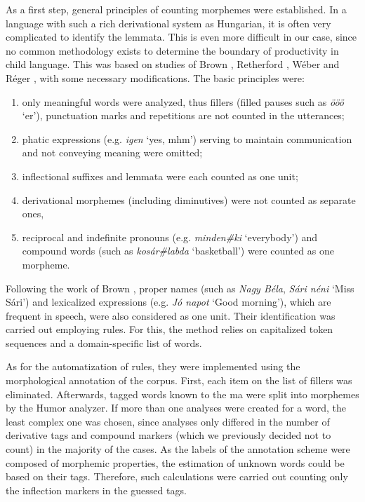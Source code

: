 As a first step, general principles of counting morphemes were established. 
In a language with such a rich derivational system as Hungarian, it is often very complicated to identify the lemmata. 
This is even more difficult in our case, since no common methodology exists to determine the boundary of productivity in child language. 
This was based on studies of Brown \cite{Brown1973}, Retherford \cite{retherford1993guide}, Wéber \cite{Weber2011} and Réger \cite{Reger1990}, with some necessary modifications. 
The basic principles were: 
\begin{enumerate}
 \item only meaningful words were analyzed, thus fillers (filled pauses such as \textit{ööö} `er’), punctuation marks and repetitions are not counted in the utterances;
 \item phatic expressions (e.g. \textit{igen} `yes, mhm’) serving to maintain communication and not conveying meaning were omitted;
 \item inflectional suffixes and lemmata were each counted as one unit; 
 \item derivational morphemes (including diminutives) were not counted as separate ones,
 \item reciprocal and indefinite pronouns (e.g. \textit{minden\#ki} `everybody’) and compound words (such as \textit{kosár\#labda} `basketball’) were counted as one morpheme.
 \end{enumerate}
 
Following the work of Brown \cite{Brown1973}, proper names (such as \textit{Nagy Béla}, \textit{Sári néni} `Miss Sári’) and lexicalized expressions (e.g. \textit{Jó napot} `Good morning’), which are frequent in speech, were also considered as one unit. 
Their identification was carried out employing rules. 
For this, the method relies on capitalized token sequences and a domain-specific list of words.

As for the automatization of rules, they were implemented using the morphological annotation of the corpus. 
First, each item on the list of fillers was eliminated.
Afterwards, tagged words known to the \acrshort{ma} were split into morphemes by the Humor analyzer. 
If more than one analyses were created for a word, the least complex one was chosen, since analyses only differed in the number of derivative tags and compound markers (which we previously decided not to count) in the majority of the cases.
As the labels of the annotation scheme were composed of morphemic properties, the estimation of unknown words could be based on their tags. 
Therefore, such calculations were carried out counting only the inflection markers in the guessed tags. 

